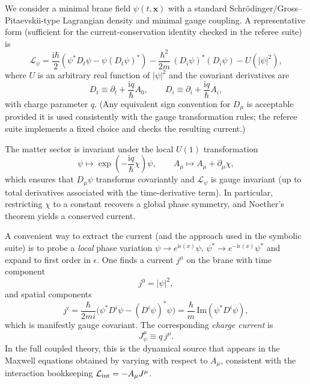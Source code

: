 \documentclass[11pt]{article}
\newcommand{\ii}{\mathrm i}
\begin{document}
We consider a minimal brane field \(\psi(t,\mathbf x)\) with a standard
Schr\"odinger/Gross--Pitaevskii-type Lagrangian density and minimal gauge
coupling. A representative form (sufficient for the current-conservation identity
checked in the referee suite) is
\begin{equation}
  \mathcal L_\psi
  =
  \frac{\ii\hbar}{2}\!\left(\psi^* D_t\psi - \psi (D_t\psi)^*\right)
  -\frac{\hbar^2}{2m}\,(D_i\psi)^*(D_i\psi)
  -U(|\psi|^2),
  \label{eq:L_matter}
\end{equation}
where \(U\) is an arbitrary real function of \(|\psi|^2\) and the covariant
derivatives are
\begin{equation}
  D_t \equiv \partial_t + \frac{\ii q}{\hbar}A_0,
  \qquad
  D_i \equiv \partial_i + \frac{\ii q}{\hbar}A_i,
  \label{eq:covariant_derivatives}
\end{equation}
with charge parameter \(q\). (Any equivalent sign convention for \(D_\mu\) is
acceptable provided it is used consistently with the gauge transformation rules;
the referee suite implements a fixed choice and checks the resulting current.)

The matter sector is invariant under the local \(U(1)\) transformation
\begin{equation}
  \psi \mapsto \exp\!\left(-\frac{\ii q}{\hbar}\chi\right)\psi,
  \qquad
  A_\mu \mapsto A_\mu + \partial_\mu \chi,
  \label{eq:matter_gauge_transform}
\end{equation}
which ensures that \(D_\mu\psi\) transforms covariantly and \(\mathcal L_\psi\)
is gauge invariant (up to total derivatives associated with the time-derivative
term). In particular, restricting \(\chi\) to a constant recovers a global phase
symmetry, and Noether's theorem yields a conserved current.

A convenient way to extract the current (and the approach used in the symbolic
suite) is to probe a \emph{local} phase variation
\(\psi\to e^{\ii \epsilon(x)}\psi\), \(\psi^*\to e^{-\ii \epsilon(x)}\psi^*\)
and expand to first order in \(\epsilon\). One finds a current \(j^\mu\) on the
brane with time component
\begin{equation}
  j^0 = |\psi|^2,
  \label{eq:j0}
\end{equation}
and spatial components
\begin{equation}
  j^i
  = \frac{\hbar}{2mi}\Big(\psi^* D^i\psi - (D^i\psi)^*\psi\Big)
  = \frac{\hbar}{m}\,\mathrm{Im}\!\left(\psi^* D^i\psi\right),
  \label{eq:ji_covariant}
\end{equation}
which is manifestly gauge covariant. The corresponding \emph{charge current} is
\begin{equation}
  J_\psi^\mu \equiv q\,j^\mu.
  \label{eq:charge_current_def}
\end{equation}
In the full coupled theory, this is the dynamical source that appears in the
Maxwell equations obtained by varying with respect to \(A_\mu\), consistent with
the interaction bookkeeping \(\mathcal L_{\rm int}=-A_\mu J^\mu\).
\end{document}
